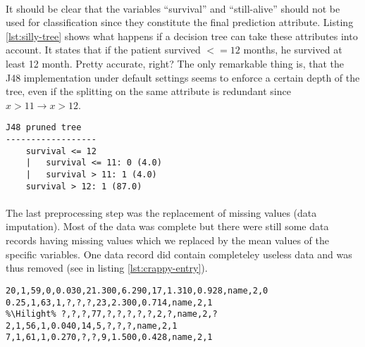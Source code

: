 \documentclass[paper=a4, fontsize=11pt]{scrartcl} %
\newcommand{\Hilight}{\makebox[0pt][l]{\color{red}\rule[-4pt]{0.65\linewidth}{14pt}}}
\numberwithin{equation}{section} %
\numberwithin{figure}{section} %
\numberwithin{table}{section} %
\begin{document}
\paragraph{}It should be clear that the variables ``survival'' and ``still-alive'' should not be used for classification since they constitute the final prediction attribute. Listing \ref{lst:silly-tree} shows what happens if a decision tree can take these attributes into account. It states that if the patient survived $ <= 12 $ months, he survived at least 12 month. Pretty accurate, right? 
The only remarkable thing is, that the J48 implementation under default settings seems to enforce a certain depth of the tree, even if the splitting on the same attribute is redundant since $ x > 11 \rightarrow x > 12 $. 

\begin{lstlisting}[caption={Decision tree on 100\% dependant attributes}, label=lst:silly-tree, float=htb]
J48 pruned tree
------------------
    survival <= 12
    |   survival <= 11: 0 (4.0)
    |   survival > 11: 1 (4.0)
    survival > 12: 1 (87.0)
\end{lstlisting}

\paragraph{}The last preprocessing step was the replacement of missing values (data imputation). Most of the data was complete but there were still some data records having missing values which we replaced by the mean values of the specific variables. One data record did contain completeley useless data and was thus removed (see in listing \ref{lst:crappy-entry}).

\begin{lstlisting}[escapechar=\%, float=htb, caption={76 years old patient without useful information}, label=lst:crappy-entry]
20,1,59,0,0.030,21.300,6.290,17,1.310,0.928,name,2,0
0.25,1,63,1,?,?,?,23,2.300,0.714,name,2,1
%\Hilight% ?,?,?,77,?,?,?,?,?,2,?,name,2,?
2,1,56,1,0.040,14,5,?,?,?,name,2,1
7,1,61,1,0.270,?,?,9,1.500,0.428,name,2,1
\end{lstlisting}

\paragraph{}
\end{document}
